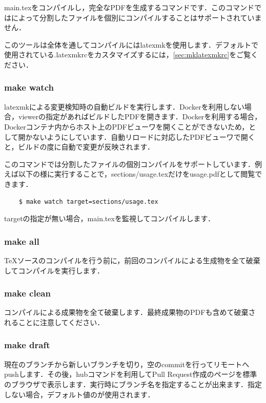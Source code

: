 \documentclass[main]{subfiles}
\begin{document}
main.texをコンパイルし，完全なPDFを生成するコマンドです．このコマンドではによって分割したファイルを個別にコンパイルすることはサポートされていません．

このツールは全体を通してコンパイルにはlatexmkを使用します．デフォルトで使用されている.latexmkrcをカスタマイズするには，\ref{sec:mklatexmkrc}をご覧ください．

\subsubsection{make watch}

latexmkによる変更検知時の自動ビルドを実行します．Dockerを利用しない場合，viewerの指定があればビルドしたPDFを開きます．Dockerを利用する場合，Dockerコンテナ内からホスト上のPDFビューワを開くことができないため，として開かないようにしています．自動リロードに対応したPDFビューワで開くと，ビルドの度に自動で変更が反映されます．


このコマンドでは分割したファイルの個別コンパイルをサポートしています．例えば以下の様に実行することで，sections/usage.texだけをusage.pdfとして閲覧できます．

\begin{lstlisting}
    $ make watch target=sections/usage.tex
\end{lstlisting}
targetの指定が無い場合，main.texを監視してコンパイルします．

\subsubsection{make all}

TeXソースのコンパイルを行う前に，前回のコンパイルによる生成物を全て破棄してコンパイルを実行します．

\subsubsection{make clean}

コンパイルによる成果物を全て破棄します．最終成果物のPDFも含めて破棄されることに注意してください．

\subsubsection{make draft}

現在のブランチから新しいブランチを切り，空のcommitを行ってリモートへpushします．その後，hubコマンドを利用してPull Request作成のページを標準のブラウザで表示します．実行時にブランチ名を指定することが出来ます．指定しない場合，デフォルト値のが使用されます．
\end{document}
